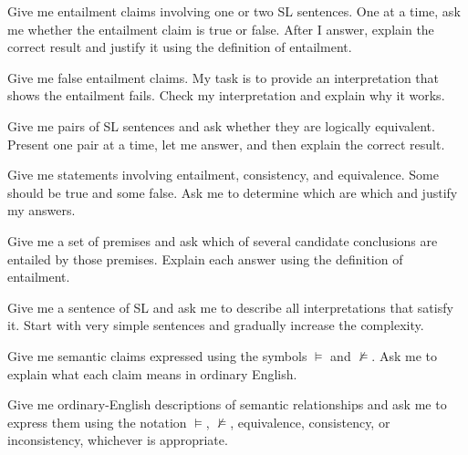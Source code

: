 \begin{genaipractice}[]

\item Give me entailment claims involving one or two SL sentences. One at a time, ask me whether the entailment claim is true or false. After I answer, explain the correct result and justify it using the definition of entailment.

\item Give me false entailment claims. My task is to provide an interpretation that shows the entailment fails. Check my interpretation and explain why it works.

\item Give me pairs of SL sentences and ask whether they are logically equivalent. Present one pair at a time, let me answer, and then explain the correct result.

\item Give me statements involving entailment, consistency, and equivalence. Some should be true and some false. Ask me to determine which are which and justify my answers.

\item Give me a set of premises and ask which of several candidate conclusions are entailed by those premises. Explain each answer using the definition of entailment.

\item Give me a sentence of SL and ask me to describe all interpretations that satisfy it. Start with very simple sentences and gradually increase the complexity.

\item Give me semantic claims expressed using the symbols $\models$ and $\not\models$. Ask me to explain what each claim means in ordinary English.

\item Give me ordinary-English descriptions of semantic relationships and ask me to express them using the notation $\models$, $\not\models$, equivalence, consistency, or inconsistency, whichever is appropriate.

\end{genaipractice}